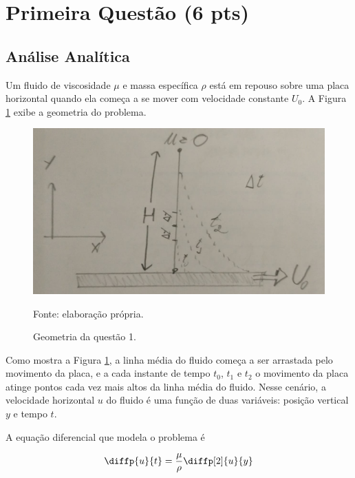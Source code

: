 
\section{Primeira Questão (6 pts)}

\subsection{Análise Analítica}


Um fluido de viscosidade $\mu$ e massa específica $\rho$ está em repouso
sobre uma placa horizontal quando ela começa a se mover com velocidade constante
$U_0$. A Figura \ref*{fig:geometriaQ1} exibe a geometria do problema.


\begin{figure}[h!]
    \caption{Geometria da questão 1.}
    \label{fig:geometriaQ1}
    \centering
    \centerline{\includegraphics[scale=0.35]{geometriaQ1.png}}
    \par{Fonte: elaboração própria.}
\end{figure}

Como mostra a Figura \ref*{fig:geometriaQ1}, a linha média do fluido começa
a ser arrastada pelo movimento da placa, e a cada instante de tempo $t_0$,
$t_1$ e $t_2$ o movimento da placa atinge pontos cada vez mais altos
da linha média do fluido. Nesse cenário, a velocidade horizontal $u$ do
fluido é uma função de duas variáveis: posição vertical $y$ e tempo $t$.

A equação diferencial que modela o problema é

\begin{equation}\label{eq:modeloQ1}
    \diffp{u}{t} = \frac{\mu}{\rho} \diffp[2]{u}{y}
\end{equation}

